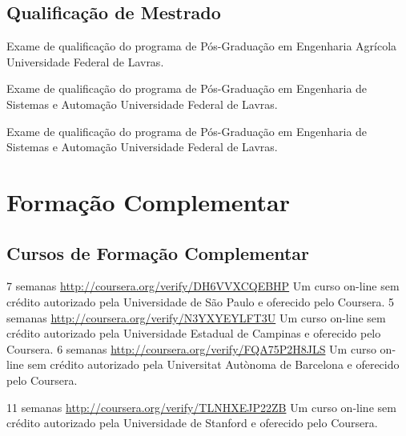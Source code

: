 \documentclass[11pt,a4paper,sans]{moderncv} %
\begin{document}
\subsection{Qualificação de Mestrado}
			{}
			{Exame de qualificação do programa de Pós-Graduação em Engenharia Agrícola}{}
			{Universidade Federal de Lavras.}

			{}
			{Exame de qualificação do programa de Pós-Graduação em Engenharia de Sistemas e Automação}{}
			{Universidade Federal de Lavras.}

			{}
			{Exame de qualificação do programa de Pós-Graduação em Engenharia de Sistemas e Automação}{}
			{Universidade Federal de Lavras.}
\section{Formação Complementar}

\subsection{ Cursos de Formação Complementar }
	      {7 semanas}
	      {\url{http://coursera.org/verify/DH6VVXCQEBHP}}{}
	      {Um curso on-line sem crédito autorizado pela Universidade de São Paulo e oferecido pelo Coursera.}
	      {5 semanas}
	      {\url{http://coursera.org/verify/N3YXYEYLFT3U}}{}
	      {Um curso on-line sem crédito autorizado pela Universidade Estadual de Campinas e oferecido pelo Coursera.}
	      {6 semanas}
	      {\url{http://coursera.org/verify/FQA75P2H8JLS}}{}
	      {Um curso on-line sem crédito autorizado pela Universitat Autònoma de Barcelona e oferecido pelo Coursera.}

	      {11 semanas}
	      {\url{http://coursera.org/verify/TLNHXEJP22ZB}}{}
	      {Um curso on-line sem crédito autorizado pela Universidade de Stanford e oferecido pelo Coursera.}
\end{document}
